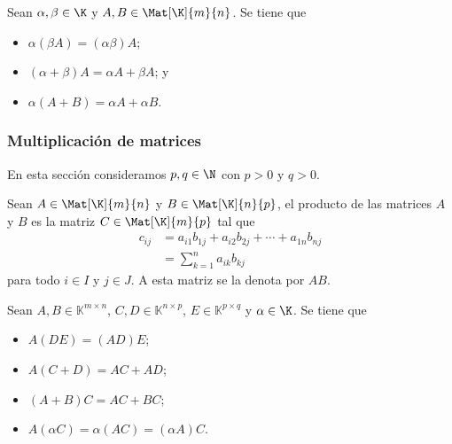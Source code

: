 \documentclass[a4,11pt]{aleph-notas}
\begin{document}
\begin{teo}
    Sean $\alpha,\beta \in \K$ y $A,B\in\Mat[\K]{m}{n}$. Se tiene que
    \begin{itemize}
    \item 
        $\alpha(\beta A) = (\alpha\beta)A$;
    \item 
        $(\alpha+\beta)A = \alpha A + \beta A$; y
    \item 
        $\alpha(A+B) = \alpha A + \alpha B$.
    \end{itemize}
\end{teo}


\subsubsection{Multiplicación de matrices}

En esta sección consideramos  $p,q\in \N$ con $p>0$ y $q>0$.



\begin{defi}
    Sean $A \in \Mat[\K]{m}{n}$ y $B \in \Mat[\K]{n}{p}$, el producto de las matrices $A$ y $B$ es la matriz $C \in \Mat[\K]{m}{p}$ tal que
    \begin{align*}
        c_{ij} & = a_{i1}b_{1j} + a_{i2} b_{2j} + \cdots + a_{1n}b_{nj} \\
               & = \sum_{k=1}^n a_{ik} b_{kj}
    \end{align*}
    para todo $i \in I$ y $j \in J$. A esta matriz se la denota por $AB$.
\end{defi}



\begin{teo}
    Sean $A, B\in \mathbb{K}^{m \times n}$, $C,D\in \mathbb{K}^{n \times p}$, $E\in \mathbb{K}^{p \times q}$ y $\alpha \in\K$. Se tiene que
    \begin{itemize}
    \item 
        $A(DE) = (AD)E$;
    \item 
        $A(C+D) = AC + AD$; 
    \item 
        $(A+B)C = AC + BC$; 
    
    \item 
        $A(\alpha C) = \alpha (AC) = (\alpha A) C$.
    \end{itemize}
\end{teo}
\end{document}
